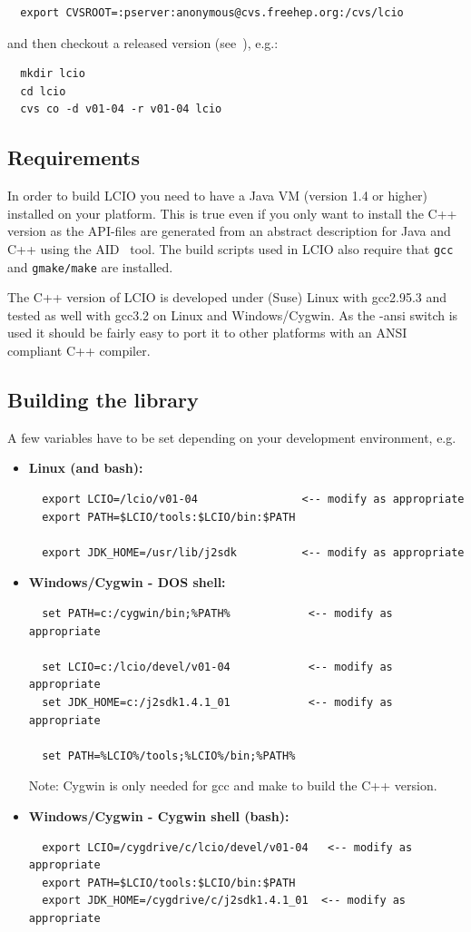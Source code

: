 \documentclass[twoside]{article}
\begin{document}
\begin{verbatim}
  export CVSROOT=:pserver:anonymous@cvs.freehep.org:/cvs/lcio
\end{verbatim}

and then checkout a released version (see~\cite{lcio_home}), e.g.:
\begin{verbatim}
  mkdir lcio 
  cd lcio
  cvs co -d v01-04 -r v01-04 lcio
\end{verbatim}

\subsection{Requirements}
In order to build LCIO you need to have a Java VM (version 1.4 or higher) installed 
on your platform. This is true even if you only want to install the C++ version as the 
API-files are generated from an abstract description for Java and C++ using the 
AID~\cite{ref_aid} tool. The build scripts used in LCIO also require that \verb$gcc$ and 
\verb$gmake/make$ are installed.

The C++ version of LCIO is developed under (Suse) Linux with gcc2.95.3 and tested
as well with gcc3.2 on Linux and Windows/Cygwin. 
As the -ansi switch is used it should be fairly easy to port it to other platforms with
an ANSI compliant C++ compiler.

\subsection {Building the library}

A few variables have to be set depending on your development environment, e.g.
\begin{itemize}
\item{ {\bf Linux (and bash):} 
\begin{verbatim} 
  export LCIO=/lcio/v01-04                <-- modify as appropriate
  export PATH=$LCIO/tools:$LCIO/bin:$PATH

  export JDK_HOME=/usr/lib/j2sdk          <-- modify as appropriate
\end{verbatim} 
}
\item{ {\bf Windows/Cygwin - DOS shell:} 
\begin{verbatim}
  set PATH=c:/cygwin/bin;%PATH%            <-- modify as appropriate

  set LCIO=c:/lcio/devel/v01-04            <-- modify as appropriate
  set JDK_HOME=c:/j2sdk1.4.1_01            <-- modify as appropriate 

  set PATH=%LCIO%/tools;%LCIO%/bin;%PATH%
\end{verbatim}
Note: Cygwin is only needed for gcc and make to build the C++ version.
}
\item{ {\bf Windows/Cygwin - Cygwin shell (bash):} 
\begin{verbatim}
  export LCIO=/cygdrive/c/lcio/devel/v01-04   <-- modify as appropriate
  export PATH=$LCIO/tools:$LCIO/bin:$PATH
  export JDK_HOME=/cygdrive/c/j2sdk1.4.1_01  <-- modify as appropriate
\end{verbatim} %
}
\end{itemize}
\end{document}
